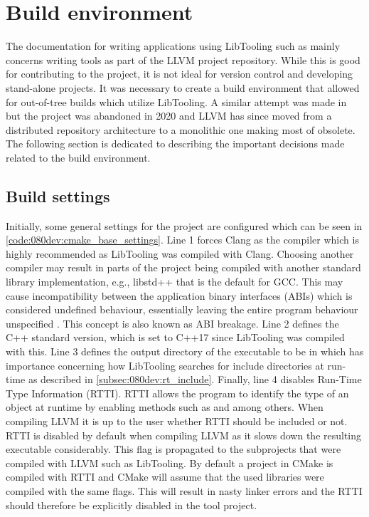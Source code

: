 \section{Build environment} \label{sec:080dev:build_env}

The documentation for writing applications using LibTooling such as \cite{MatchingClangAST, ClangTransformerTutorial} mainly concerns writing tools as part of the LLVM project repository. While this is good for contributing to the project, it is not ideal for version control and developing stand-alone projects.
It was necessary to create a build environment that allowed for out-of-tree builds which utilize LibTooling. A similar attempt was made in \cite{kasmisClangOutoftreeBuild2023} but the project was abandoned in 2020 and LLVM has since moved from a distributed repository architecture to a monolithic one making most of \cite{kasmisClangOutoftreeBuild2023} obsolete.
The following section is dedicated to describing the important decisions made related to the build environment.

\subsection{Build settings}

Initially, some general settings for the project are configured which can be seen in \cref{code:080dev:cmake_base_settings}.
Line 1 forces Clang as the compiler which is highly recommended as LibTooling was compiled with Clang. Choosing another compiler may result in parts of the project being compiled with another standard library implementation, e.g., libstd++ that is the default for GCC. This may cause incompatibility between the application binary interfaces (ABIs) which is considered undefined behaviour, essentially leaving the entire program behaviour unspecified \cite{cppreferenceUndefinedBehaviorCppreference}. This concept is also known as ABI breakage.
Line 2 defines the C++ standard version, which is set to C++17 since LibTooling was compiled with this.
Line 3 defines the output directory of the executable to be in  which has importance concerning how LibTooling searches for include directories at run-time as described in \cref{subsec:080dev:rt_include}.
Finally, line 4 disables Run-Time Type Information (RTTI). RTTI allows the program to identify the type of an object at runtime by enabling methods such as  and  among others. When compiling LLVM it is up to the user whether RTTI should be included or not. RTTI is disabled by default when compiling LLVM as it slows down the resulting executable considerably. This flag is propagated to the subprojects that were compiled with LLVM such as LibTooling. By default a project in CMake is compiled with RTTI and CMake will assume that the used libraries were compiled with the same flags. This will result in nasty linker errors and the RTTI should therefore be explicitly disabled in the tool project.

